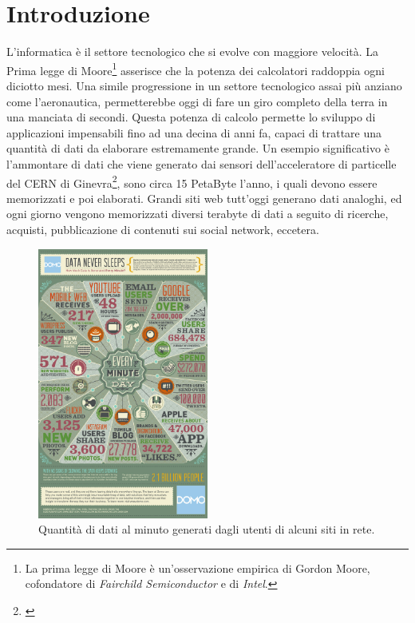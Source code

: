 
\chapter{Introduzione}\label{cap:introduzione}
L'informatica è il settore tecnologico che si evolve con maggiore velocità. La Prima legge di Moore\footnote{La prima legge di Moore è un'osservazione empirica di Gordon Moore, cofondatore di \emph{Fairchild Semiconductor} e di \emph{Intel}.} asserisce che la potenza dei calcolatori raddoppia ogni diciotto mesi. Una simile progressione in un settore tecnologico assai più anziano come l'aeronautica, permetterebbe oggi di fare un giro completo della terra in una manciata di secondi. Questa potenza di calcolo permette lo sviluppo di applicazioni impensabili fino ad una decina di anni fa, capaci di trattare una quantità di dati da elaborare estremamente grande. Un esempio significativo è l'ammontare di dati che viene generato dai sensori dell'acceleratore di particelle del CERN di Ginevra\footnote{\cite{pres_cern}}, sono circa 15 PetaByte l'anno, i quali devono essere memorizzati e poi elaborati. Grandi siti web tutt'oggi generano dati analoghi, ed ogni giorno vengono memorizzati diversi terabyte di dati a seguito di ricerche, acquisti, pubblicazione di contenuti sui social network, eccetera. 
\begin{figure}
	\centering
	\includegraphics[width=0.50\textwidth]{Data-in-One-Minute.jpg}
	\caption{Quantità di dati al minuto generati dagli utenti di alcuni siti in rete.}
	\label{img:dpm}
\end{figure}
